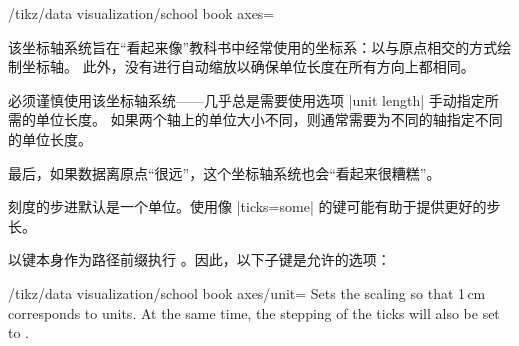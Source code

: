 \begin{key}{/tikz/data visualization/school book axes=} %

    该坐标轴系统旨在``看起来像''教科书中经常使用的坐标系：以与原点相交的方式绘制坐标轴。 此外，没有进行自动缩放以确保单位长度在所有方向上都相同。


    必须谨慎使用该坐标轴系统——几乎总是需要使用选项 |unit length| 手动指定所需的单位长度。 如果两个轴上的单位大小不同，则通常需要为不同的轴指定不同的单位长度。


    最后，如果数据离原点``很远''，这个坐标轴系统也会``看起来很糟糕''。
\begin{codeexample}[preamble={\usetikzlibrary{datavisualization.formats.functions}}]
\end{codeexample}


    刻度的步进默认是一个单位。使用像 |ticks=some| 的键可能有助于提供更好的步长。


    以键本身作为路径前缀执行 。因此，以下子键是允许的选项：
    \begin{key}{/tikz/data visualization/school book axes/unit=} %
        Sets the scaling so that 1\,cm corresponds to  units. At the same time, the stepping of the ticks will also be set to .


\end{key}
\end{key}
